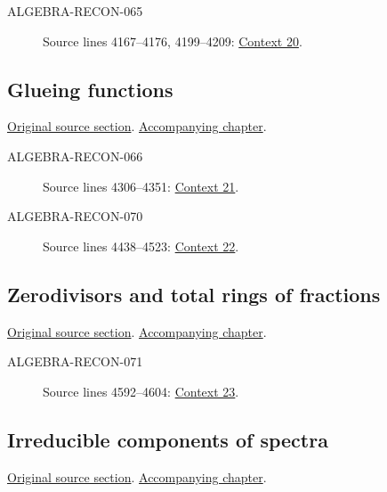 \begin{description}
\item[ALGEBRA-RECON-065] Source lines 4167--4176, 4199--4209: \hyperlink{algebra-context-020}{Context 20}.
\end{description}

\subsection{Glueing functions}
\hypertarget{algebra-source-section-tilde-module-sheaf}{}
\noindent\href{https://github.com/stacks/stacks-project/blob/a04446e57ec1fbc252a871afcec7752fb2807b14/algebra.tex\#L4284}{Original source section}. \href{algebra.pdf\#nameddest=section-tilde-module-sheaf}{Accompanying chapter}.

\begin{description}
\item[ALGEBRA-RECON-066] Source lines 4306--4351: \hyperlink{algebra-context-021}{Context 21}.
\item[ALGEBRA-RECON-070] Source lines 4438--4523: \hyperlink{algebra-context-022}{Context 22}.
\end{description}

\subsection{Zerodivisors and total rings of fractions}
\hypertarget{algebra-source-section-total-quotient-ring}{}
\noindent\href{https://github.com/stacks/stacks-project/blob/a04446e57ec1fbc252a871afcec7752fb2807b14/algebra.tex\#L4536}{Original source section}. \href{algebra.pdf\#nameddest=section-total-quotient-ring}{Accompanying chapter}.

\begin{description}
\item[ALGEBRA-RECON-071] Source lines 4592--4604: \hyperlink{algebra-context-023}{Context 23}.
\end{description}

\subsection{Irreducible components of spectra}
\hypertarget{algebra-source-section-irreducible}{}
\noindent\href{https://github.com/stacks/stacks-project/blob/a04446e57ec1fbc252a871afcec7752fb2807b14/algebra.tex\#L4656}{Original source section}. \href{algebra.pdf\#nameddest=section-irreducible}{Accompanying chapter}.

